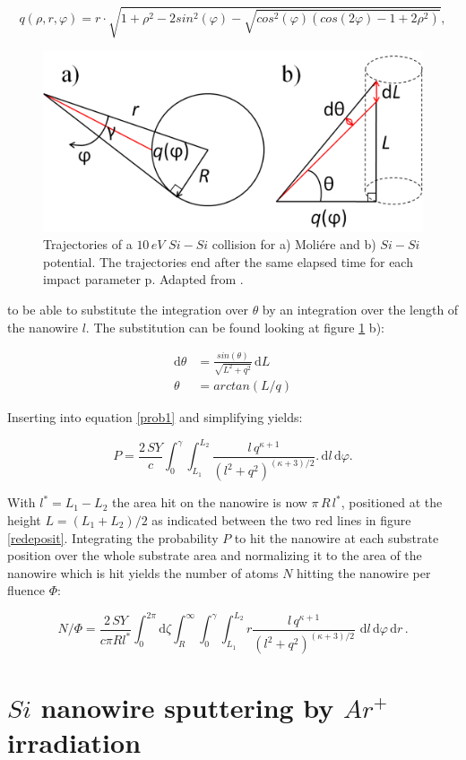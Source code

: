 \begin{equation}
q(\rho,r,\varphi) = r\cdot \sqrt{1 + \rho^2 - 2sin^2(\varphi) - \sqrt{cos^2(\varphi)(cos(2\varphi) - 1 + 2\rho^2)}},
\end{equation}

\begin{figure}
	\centering
		\includegraphics[width=.6\textwidth]{images/anglesredeposition.jpg}
	\caption{Trajectories of a $10\,eV$ $Si-Si$ collision for a) Moliére and b) $Si-Si$ potential. The trajectories end after the same elapsed time for each impact parameter p. Adapted from \cite{eckstein_computer_1991}.}
	\label{anglesredepo}
\end{figure} 

to be able to substitute the integration over $\theta$ by an integration over the length of the nanowire $l$. The substitution can be found looking at figure \ref{anglesredepo} b):

\begin{align*}
\mathrm{d}\theta &= \frac{sin(\theta)}{\sqrt{L^2 + q^2}}\,\mathrm{d}L\\
\theta &= arctan(L/q)
\end{align*}

Inserting into equation \ref{prob1} and simplifying yields:

\begin{equation}
\label{prob2}
P = \frac{2\,SY}{c} \int_0^{\gamma} \! \int_{L_1}^{L_2} \!  \frac{l\,q^{\kappa+1}}{(l^2 + q^2)^{(\kappa + 3)/2}}.
\,\mathrm{d}l \, \mathrm{d}\varphi.
\end{equation}

With $l^*=L_1-L_2$ the area hit on the nanowire is now $\pi \, R \, l^*$, positioned at the height $L= (L_1+L_2)/2$ as indicated between the two red lines in figure \ref{redeposit}. Integrating the probability $P$ to hit the nanowire at each substrate position over the whole substrate area and normalizing it to the area of the nanowire which is hit yields the number of atoms $N$ hitting the nanowire per fluence $\Phi$:

\begin{equation}
\label{prob2}
N/\Phi = \frac{2\,SY}{c \pi Rl^*} \int_0^{2\pi}\! \mathrm{d}\zeta \int_R^{\infty} \!
\int_0^{\gamma} \! \int_{L_1}^{L_2} \! r \frac{l\,q^{\kappa+1}}{(l^2 + q^2)^{(\kappa + 3)/2}}\,\,\mathrm{d}l \, \mathrm{d}\varphi\,\mathrm{d}r \, .
\end{equation}




\section{$Si$ nanowire sputtering by $Ar^+$ irradiation}
\label{sec:sisputtering}